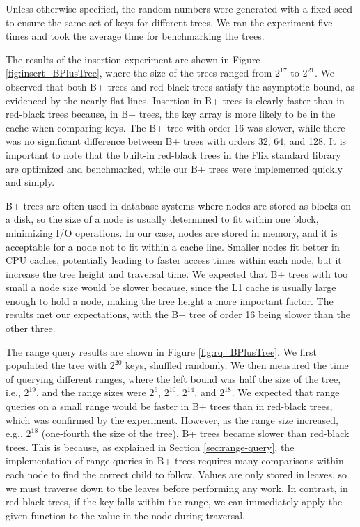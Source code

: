 \documentclass[11pt]{report}
\theoremstyle{definition}
\begin{document}
Unless otherwise specified, the random numbers were generated with a fixed seed to ensure the same set of keys for different trees. We ran the experiment five times and took the average time for benchmarking the trees.

The results of the insertion experiment are shown in Figure \ref{fig:insert_BPlusTree}, where the size of the trees ranged from $2^{17}$ to $2^{21}$. We observed that both B+ trees and red-black trees satisfy the asymptotic bound, as evidenced by the nearly flat lines. Insertion in B+ trees is clearly faster than in red-black trees because, in B+ trees, the key array is more likely to be in the cache when comparing keys. The B+ tree with order 16 was slower, while there was no significant difference between B+ trees with orders 32, 64, and 128. It is important to note that the built-in red-black trees in the Flix standard library are optimized and benchmarked, while our B+ trees were implemented quickly and simply.

B+ trees are often used in database systems where nodes are stored as blocks on a disk, so the size of a node is usually determined to fit within one block, minimizing I/O operations. In our case, nodes are stored in memory, and it is acceptable for a node not to fit within a cache line. Smaller nodes fit better in CPU caches, potentially leading to faster access times within each node, but it increase the tree height and traversal time. We expected that B+ trees with too small a node size would be slower because, since the L1 cache is usually large enough to hold a node, making the tree height a more important factor. The results met our expectations, with the B+ tree of order 16 being slower than the other three.

The range query results are shown in Figure \ref{fig:rq_BPlusTree}. We first populated the tree with $2^{20}$ keys, shuffled randomly. We then measured the time of querying different ranges, where the left bound was half the size of the tree, i.e., $2^{19}$, and the range sizes were $2^6$, $2^{10}$, $2^{14}$, and $2^{18}$. We expected that range queries on a small range would be faster in B+ trees than in red-black trees, which was confirmed by the experiment. However, as the range size increased, e.g., $2^{18}$ (one-fourth the size of the tree), B+ trees became slower than red-black trees. This is because, as explained in Section \ref{sec:range-query}, the implementation of range queries in B+ trees requires many comparisons within each node to find the correct child to follow. Values are only stored in leaves, so we must traverse down to the leaves before performing any work. In contrast, in red-black trees, if the key falls within the range, we can immediately apply the given function to the value in the node during traversal.
\end{document}
